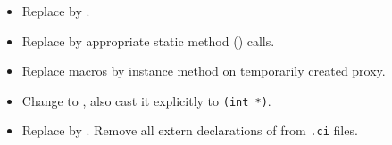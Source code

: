 \begin{itemize}
\item Replace  by .

\item Replace  by appropriate static method
() calls. 

\item Replace  macros by  instance
method on temporarily created proxy. 

\item Change  to , also cast it
explicitly to {\tt (int *)}. 

\item Replace  by . Remove all
extern declarations of  from {\tt *.ci} files.

\end{itemize}
